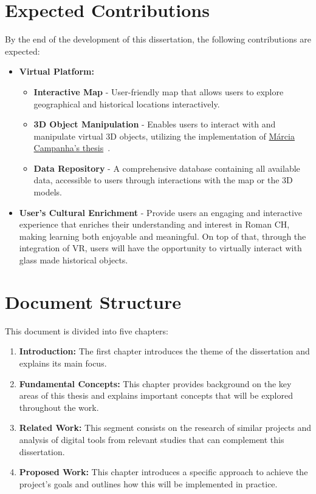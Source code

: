 \section{Expected Contributions}
\label{sec:expected_contributions}


By the end of the development of this dissertation, the following contributions are expected:


\begin{itemize}
   \item \textbf{Virtual Platform:}
   \begin{itemize}
      \item \textbf{Interactive Map} - User-friendly map that allows users to explore geographical and historical locations interactively.
      \item \textbf{3D Object Manipulation} - Enables users to interact with and manipulate virtual 3D objects, utilizing the implementation of \hyperref[sec:marcia_thesis]{Márcia Campanha's thesis}~\cite{campanha2024heritage}.
      \item  \textbf{Data Repository} - A comprehensive database containing all available data, accessible to users through interactions with the map or the \gls{3D} models.
   \end{itemize}
   \item \textbf{User's Cultural Enrichment} - Provide users an engaging and interactive experience that enriches their understanding and interest
   in Roman \gls{CH}, making learning both enjoyable and meaningful.
   On top of that, through the integration of \gls{VR}, users will have the opportunity to virtually interact with glass made historical objects.
\end{itemize}


\section{Document Structure}
\label{sec:document_structure}


This document is divided into five chapters:

\begin{enumerate}
  \item \textbf{Introduction:} The first chapter introduces the theme of the dissertation and explains its main focus.
  
  \item \textbf{Fundamental Concepts:} This chapter provides background on the key areas of this thesis and explains important concepts that will be explored throughout the work.
  
  \item \textbf{Related Work:} This segment consists on the research of similar projects and analysis of digital tools from relevant studies that can complement this dissertation.

  \item \textbf{Proposed Work:} This chapter introduces a specific approach to achieve the project's goals and outlines how this will be implemented in practice.
\end{enumerate}
